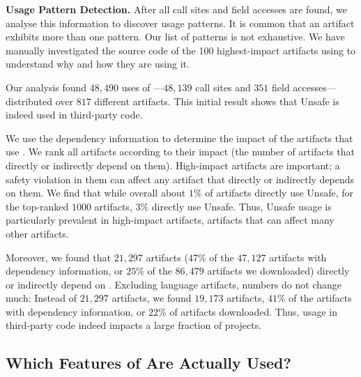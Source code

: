 \textbf{Usage Pattern Detection.}
After all call sites and field accesses are found,
we analyse this information to discover usage patterns.
It is common that an artifact exhibits more than one pattern.
Our list of patterns is not exhaustive.
We have manually investigated the source code of the 100 highest-impact artifacts using  to understand why and how they are using it.

Our analysis found $48,490$ uses of ---$48,139$ call sites and $351$ field accesses---distributed over $817$ different artifacts.
This initial result shows that Unsafe is indeed used in third-party code.

We use the dependency information to determine the impact of the artifacts that use .
We rank all artifacts according to their impact (the number of artifacts that directly or indirectly depend on them).
High-impact artifacts are important;
a safety violation in them can affect any artifact that directly or indirectly depends on them.
We find that while overall about $1\%$ of artifacts directly use Unsafe,
for the top-ranked $1000$ artifacts, $3\%$ directly use Unsafe.
Thus, Unsafe usage is particularly prevalent in high-impact artifacts, artifacts that can affect many other artifacts.

Moreover, we found that $21,297$ artifacts ($47\%$ of the $47,127$ artifacts with dependency information, or $25\%$ of the $86,479$ artifacts we downloaded) directly or indirectly depend on .
Excluding language artifacts, numbers do not change much:
Instead of $21,297$ artifacts, we found $19,173$ artifacts,
$41\%$ of the artifacts with dependency information, or $22\%$ of artifacts downloaded.
Thus,  usage in third-party code indeed impacts a large fraction of projects.


\subsection*{Which Features of \unsafe{} Are Actually Used?}

